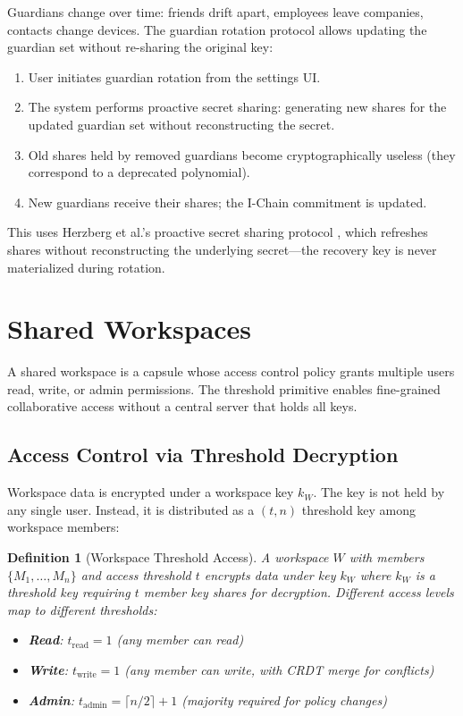 \documentclass[11pt,a4paper]{article}
\newtheorem{definition}{Definition}
\begin{document}
Guardians change over time: friends drift apart, employees leave companies,
contacts change devices. The guardian rotation protocol allows updating the
guardian set without re-sharing the original key:

\begin{enumerate}
    \item User initiates guardian rotation from the settings UI.
    \item The system performs proactive secret sharing: generating new shares
    for the updated guardian set without reconstructing the secret.
    \item Old shares held by removed guardians become cryptographically
    useless (they correspond to a deprecated polynomial).
    \item New guardians receive their shares; the I-Chain commitment is updated.
\end{enumerate}

This uses Herzberg et al.'s proactive secret sharing protocol
\cite{herzberg1995proactive}, which refreshes shares without
reconstructing the underlying secret---the recovery key is never
materialized during rotation.

\section{Shared Workspaces}\label{sec:workspaces}

A shared workspace is a capsule whose access control policy grants
multiple users read, write, or admin permissions. The threshold
primitive enables fine-grained collaborative access without a
central server that holds all keys.

\subsection{Access Control via Threshold Decryption}

Workspace data is encrypted under a workspace key $k_W$. The key is
not held by any single user. Instead, it is distributed as a $(t, n)$
threshold key among workspace members:

\begin{definition}[Workspace Threshold Access]
A workspace $W$ with members $\{M_1, \ldots, M_n\}$ and access threshold
$t$ encrypts data under key $k_W$ where $k_W$ is a threshold key requiring
$t$ member key shares for decryption. Different access levels map to
different thresholds:
\begin{itemize}
    \item \textbf{Read}: $t_{\text{read}} = 1$ (any member can read)
    \item \textbf{Write}: $t_{\text{write}} = 1$ (any member can write, with CRDT merge for conflicts)
    \item \textbf{Admin}: $t_{\text{admin}} = \lceil n/2 \rceil + 1$ (majority required for policy changes)
\end{itemize}
\end{definition}
\end{document}

